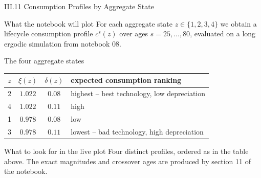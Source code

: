 \documentclass[aspectratio=169,11pt]{beamer}
\newcommand{\emphc}[1]{\textcolor{harvardcrimson}{#1}}
\begin{document}
\begin{frame}{III.11 Consumption Profiles by Aggregate State}
\footnotesize
\begin{block}{What the notebook will plot}
For each aggregate state $z \in \{1,2,3,4\}$ we obtain a lifecycle consumption profile $c^s(z)$ over ages $s=25,\ldots,80$, evaluated on a long ergodic simulation from notebook 08.
\end{block}

\begin{block}{The four aggregate states}
\centering\renewcommand{\arraystretch}{1.05}
\begin{tabular}{cccl}
\toprule
$z$ & $\xi(z)$ & $\delta(z)$ & expected consumption ranking \\
\midrule
2 & $1.022$ & $0.08$ & \emphc{highest} -- best technology, low depreciation \\
4 & $1.022$ & $0.11$ & high \\
1 & $0.978$ & $0.08$ & low \\
3 & $0.978$ & $0.11$ & \emphc{lowest} -- bad technology, high depreciation \\
\bottomrule
\end{tabular}
\end{block}

\begin{alertblock}{What to look for in the live plot}
Four distinct profiles, ordered as in the table above.  The exact magnitudes and crossover ages are produced by section 11 of the notebook.
\end{alertblock}
\end{frame}
\end{document}

